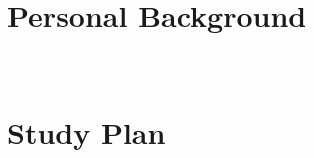 \documentclass{article}
\begin{document}
\pagestyle{fancy}

\section{ \textbf{Personal Background}}

 \\

\section{ \textbf{Study Plan}}
\end{document}
